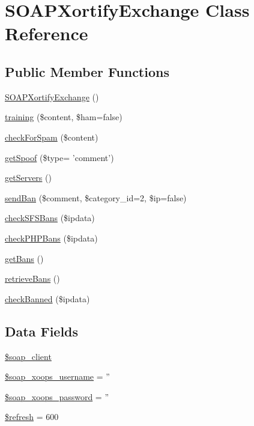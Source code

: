 \hypertarget{class_s_o_a_p_xortify_exchange}{\section{S\-O\-A\-P\-Xortify\-Exchange Class Reference}
\label{class_s_o_a_p_xortify_exchange}
}
\subsection*{Public Member Functions}
\begin{DoxyCompactItemize}
\item 
\hyperlink{class_s_o_a_p_xortify_exchange_add339868d9ad9a22afe8c95564aa063a}{S\-O\-A\-P\-Xortify\-Exchange} ()
\item 
\hyperlink{class_s_o_a_p_xortify_exchange_a3b3be735e633ba330c6b5d086aa508cd}{training} (\$content, \$ham=false)
\item 
\hyperlink{class_s_o_a_p_xortify_exchange_a7a4f53c3841dc7806455261af557d514}{check\-For\-Spam} (\$content)
\item 
\hyperlink{class_s_o_a_p_xortify_exchange_ae7926cba79660f77479306100f492c03}{get\-Spoof} (\$type= 'comment')
\item 
\hyperlink{class_s_o_a_p_xortify_exchange_a882f365bc81e207dc2123ef707735e82}{get\-Servers} ()
\item 
\hyperlink{class_s_o_a_p_xortify_exchange_a0293acfa4afe0cb5b2816352a35d8ca7}{send\-Ban} (\$comment, \$category\-\_\-id=2, \$ip=false)
\item 
\hyperlink{class_s_o_a_p_xortify_exchange_a985a563a84e3e5c54694fcce192bda53}{check\-S\-F\-S\-Bans} (\$ipdata)
\item 
\hyperlink{class_s_o_a_p_xortify_exchange_aeb1bf9aaee4718870adbd07333490aaf}{check\-P\-H\-P\-Bans} (\$ipdata)
\item 
\hyperlink{class_s_o_a_p_xortify_exchange_aea26db2906896833d32445a698fc4cdc}{get\-Bans} ()
\item 
\hyperlink{class_s_o_a_p_xortify_exchange_a4af29af927aae9aada97ef0c2cd08fa1}{retrieve\-Bans} ()
\item 
\hyperlink{class_s_o_a_p_xortify_exchange_ae41df0f26620b727f7f63342648f6474}{check\-Banned} (\$ipdata)
\end{DoxyCompactItemize}
\subsection*{Data Fields}
\begin{DoxyCompactItemize}
\item 
\hyperlink{class_s_o_a_p_xortify_exchange_a18c3d5ef7b606d5f21c8fda9d08e8c7e}{\$soap\-\_\-client}
\item 
\hyperlink{class_s_o_a_p_xortify_exchange_ab46ae973f580890282bce8dbe346abab}{\$soap\-\_\-xoops\-\_\-username} = ''
\item 
\hyperlink{class_s_o_a_p_xortify_exchange_ac116a126fa48c572acc0a859f42fa8dc}{\$soap\-\_\-xoops\-\_\-password} = ''
\item 
\hyperlink{class_s_o_a_p_xortify_exchange_a8527f826b6959aaa92b0e51ee427ba1a}{\$refresh} = 600
\end{DoxyCompactItemize}


